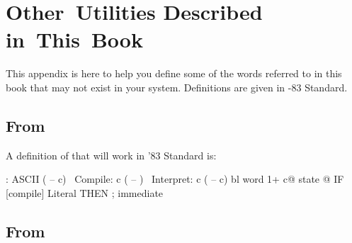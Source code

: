\chapter{Other~Utilities Described in~This~Book}

\initial This appendix is here to help you define some of the words 
referred to in this book that may not exist in your system.
Definitions are given in \Forth{}-83 Standard.

\section{From }

A definition of  that will work in '83
Standard is:
\begin{Code}
: ASCII  ( -- c)  \  Compile:  c  ( -- )
\ Interpret:   c   ( -- c)
     bl word 1+ c@  state @
     IF [compile] Literal  THEN ; immediate
\end{Code}

\section{From }

